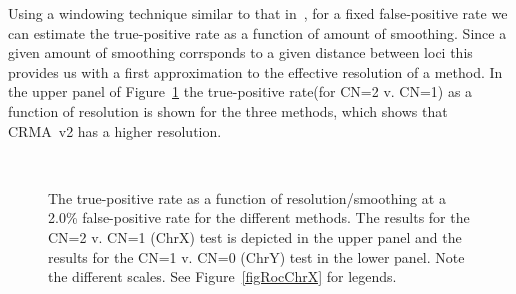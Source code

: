 \documentclass{bioinfo}
\newcommand{\TPrate}{true-positive rate\xspace}
\newcommand{\FPrate}{false-positive rate\xspace}
\begin{document}
Using a windowing technique similar to that in~\citet{BengtssonH_etal_2008a}, for a fixed \FPrate we can estimate the \TPrate as a function of amount of smoothing.  Since a given amount of smoothing corrsponds to a given distance between loci this provides us with a first approximation to the effective resolution of a method.  In the upper panel of Figure~\ref{figTPvResolutionChrXY} the \TPrate (for CN=2 v. CN=1) as a function of resolution is shown for the three methods, which shows that CRMA~v2 has a higher resolution.
\begin{figure}[!tpbh]
\begin{center}
   \\
\end{center}
 \caption{
   The \TPrate as a function of resolution/smoothing at a 2.0\% \FPrate for the different methods.
   The results for the CN=2 v. CN=1 (ChrX) test is depicted in the upper panel
   and the results for the CN=1 v. CN=0 (ChrY) test in the lower panel.
   Note the different scales.  See Figure~\ref{figRocChrX} for legends.
 }
 \label{figTPvResolutionChrXY}
\end{figure}
\end{document}
